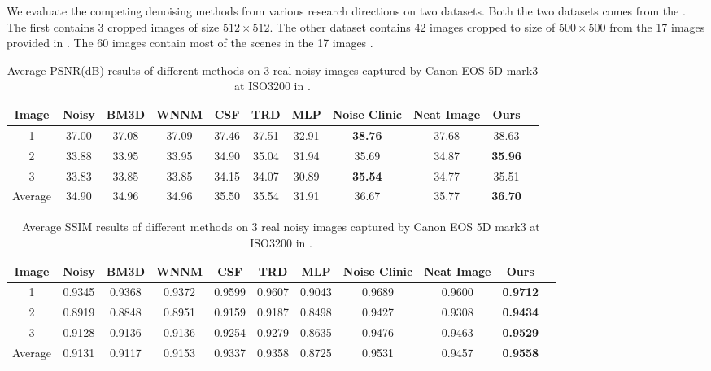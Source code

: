\documentclass[10pt,twocolumn,letterpaper]{article}
\begin{document}
We evaluate the competing denoising methods from various research directions on two datasets. Both the two datasets comes from the \cite{crosschannel2016}. The first contains 3 cropped images of size $512\times512$. The other dataset contains 42 images cropped to size of $500\times500$ from the 17 images provided in \cite{crosschannel2016}. The 60 images contain most of the scenes in the 17 images \cite{crosschannel2016}.
\begin{table*}
\caption{Average PSNR(dB) results of different methods on 3 real noisy images captured by Canon EOS 5D mark3 at ISO3200 in \cite{crosschannel2016}.}
\label{tab1}
\begin{center}
\renewcommand\arraystretch{1}
\begin{tabular}{|c||c|c|c|c|c|c|c|c|c|c|}
\hline
Image & \textbf{Noisy} &\textbf{BM3D}&\textbf{WNNM}&\textbf{CSF}&\textbf{TRD}&\textbf{MLP}& \textbf{Noise Clinic}& \textbf{Neat Image}&\textbf{Ours}
\\
\hline
1& 37.00 & 37.08 & 37.09 &  37.46  &  37.51  &  32.91  & \textbf{ 38.76}  & 37.68   & 38.63  
\\
\hline
2& 33.88 & 33.95  &  33.95  &  34.90  &  35.04  & 31.94   &  35.69  &  34.87  & \textbf{ 35.96 }
\\
\hline
3& 33.83  & 33.85  & 33.85   & 34.15   &   34.07 & 30.89   & \textbf{35.54 }  &  34.77  &  35.51 
\\
\hline
Average & 34.90  &  34.96 &  34.96  & 35.50   & 35.54   &  31.91  &  36.67  &  35.77  &  \textbf{ 36.70}
\\
\hline
\end{tabular}
\end{center}
\end{table*}

\begin{table*}
\caption{Average SSIM results of different methods on 3 real noisy images captured by Canon EOS 5D mark3 at ISO3200 in \cite{crosschannel2016}.}
\label{tab1}
\begin{center}
\renewcommand\arraystretch{1}
\begin{tabular}{|c||c|c|c|c|c|c|c|c|c|c|}
\hline
Image & \textbf{Noisy} &\textbf{BM3D}&\textbf{WNNM}&\textbf{CSF}&\textbf{TRD}&\textbf{MLP}& \textbf{Noise Clinic}& \textbf{Neat Image}&\textbf{Ours}
\\
\hline
1& 0.9345 & 0.9368  & 0.9372  & 0.9599   &  0.9607  & 0.9043   &  0.9689  & 0.9600   &\textbf{ 0.9712  }
\\
\hline
2& 0.8919 &  0.8848 &  0.8951 & 0.9159   &  0.9187  &  0.8498  &  0.9427  &  0.9308  & \textbf{ 0.9434 }
\\
\hline
3& 0.9128  & 0.9136 & 0.9136  & 0.9254   &  0.9279  &  0.8635  &  0.9476  & 0.9463   & \textbf{ 0.9529 }
\\
\hline
Average &  0.9131  & 0.9117 &  0.9153 & 0.9337   & 0.9358   &  0.8725  & 0.9531   & 0.9457   &  \textbf{0.9558} 
\\
\hline
\end{tabular}
\end{center}
\end{table*}
\end{document}
